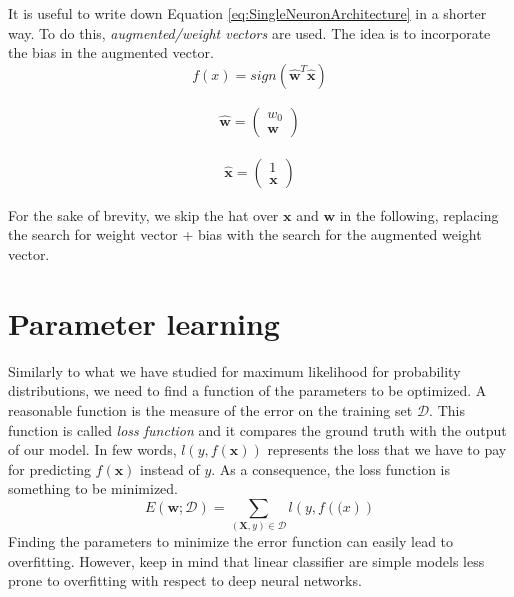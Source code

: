 It is useful to write down Equation \ref{eq:SingleNeuronArchitecture} in a
shorter way. To do this, \textit{augmented/weight vectors} are used. The idea is
to incorporate the bias in the augmented vector.
\begin{equation}
	f(x) = \mathit{sign}(\pmb{\hat{w}}^{T}\pmb{\hat{x}})
\end{equation}

\begin{align}
	\pmb{\hat{w}}= \begin{pmatrix}w_{0}\\ \pmb{w}\end{pmatrix}
\end{align}

\begin{align}
	\pmb{\hat{x}}= \begin{pmatrix}1 \\ \pmb{x}\end{pmatrix}
\end{align}

For the sake of brevity, we skip the hat over $\pmb{x}$ and $\pmb{w}$ in the following,
replacing the search for weight vector + bias with the search for the augmented
weight vector.

\section{Parameter learning}
Similarly to what we have studied for maximum likelihood for probability
distributions, we need to find a function of the parameters to be optimized. A
reasonable function is the measure of the error on the training set
$\mathcal{D}$. This function is called \textit{loss function} and it compares
the ground truth with the output of our model. In few words, $l(y, f(\pmb{x}))$
represents the loss that we have to pay for predicting $f(\pmb{x})$ instead of
$y$. As a consequence, the loss function is something to be minimized.
\begin{equation}
	\label{eq:parameterLearning_errorMinimization}E(\pmb{w}; \mathcal{D}) = \sum_{(\pmb{X},y)
	\in \mathcal{D}}l(y, f(\pmb(x))
\end{equation}
Finding the parameters to minimize the error function can easily lead to overfitting.
However, keep in mind that linear classifier are simple models less prone to overfitting
with respect to deep neural networks.

